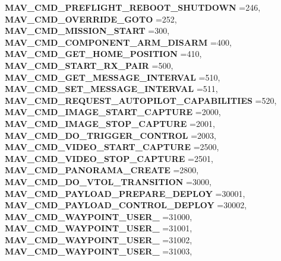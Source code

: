 \begin{DoxyCompactItemize}
\textbf{ M\+A\+V\+\_\+\+C\+M\+D\+\_\+\+P\+R\+E\+F\+L\+I\+G\+H\+T\+\_\+\+R\+E\+B\+O\+O\+T\+\_\+\+S\+H\+U\+T\+D\+O\+WN} =246, 
\newline
\textbf{ M\+A\+V\+\_\+\+C\+M\+D\+\_\+\+O\+V\+E\+R\+R\+I\+D\+E\+\_\+\+G\+O\+TO} =252, 
\textbf{ M\+A\+V\+\_\+\+C\+M\+D\+\_\+\+M\+I\+S\+S\+I\+O\+N\+\_\+\+S\+T\+A\+RT} =300, 
\textbf{ M\+A\+V\+\_\+\+C\+M\+D\+\_\+\+C\+O\+M\+P\+O\+N\+E\+N\+T\+\_\+\+A\+R\+M\+\_\+\+D\+I\+S\+A\+RM} =400, 
\textbf{ M\+A\+V\+\_\+\+C\+M\+D\+\_\+\+G\+E\+T\+\_\+\+H\+O\+M\+E\+\_\+\+P\+O\+S\+I\+T\+I\+ON} =410, 
\newline
\textbf{ M\+A\+V\+\_\+\+C\+M\+D\+\_\+\+S\+T\+A\+R\+T\+\_\+\+R\+X\+\_\+\+P\+A\+IR} =500, 
\textbf{ M\+A\+V\+\_\+\+C\+M\+D\+\_\+\+G\+E\+T\+\_\+\+M\+E\+S\+S\+A\+G\+E\+\_\+\+I\+N\+T\+E\+R\+V\+AL} =510, 
\textbf{ M\+A\+V\+\_\+\+C\+M\+D\+\_\+\+S\+E\+T\+\_\+\+M\+E\+S\+S\+A\+G\+E\+\_\+\+I\+N\+T\+E\+R\+V\+AL} =511, 
\textbf{ M\+A\+V\+\_\+\+C\+M\+D\+\_\+\+R\+E\+Q\+U\+E\+S\+T\+\_\+\+A\+U\+T\+O\+P\+I\+L\+O\+T\+\_\+\+C\+A\+P\+A\+B\+I\+L\+I\+T\+I\+ES} =520, 
\newline
\textbf{ M\+A\+V\+\_\+\+C\+M\+D\+\_\+\+I\+M\+A\+G\+E\+\_\+\+S\+T\+A\+R\+T\+\_\+\+C\+A\+P\+T\+U\+RE} =2000, 
\textbf{ M\+A\+V\+\_\+\+C\+M\+D\+\_\+\+I\+M\+A\+G\+E\+\_\+\+S\+T\+O\+P\+\_\+\+C\+A\+P\+T\+U\+RE} =2001, 
\textbf{ M\+A\+V\+\_\+\+C\+M\+D\+\_\+\+D\+O\+\_\+\+T\+R\+I\+G\+G\+E\+R\+\_\+\+C\+O\+N\+T\+R\+OL} =2003, 
\textbf{ M\+A\+V\+\_\+\+C\+M\+D\+\_\+\+V\+I\+D\+E\+O\+\_\+\+S\+T\+A\+R\+T\+\_\+\+C\+A\+P\+T\+U\+RE} =2500, 
\newline
\textbf{ M\+A\+V\+\_\+\+C\+M\+D\+\_\+\+V\+I\+D\+E\+O\+\_\+\+S\+T\+O\+P\+\_\+\+C\+A\+P\+T\+U\+RE} =2501, 
\textbf{ M\+A\+V\+\_\+\+C\+M\+D\+\_\+\+P\+A\+N\+O\+R\+A\+M\+A\+\_\+\+C\+R\+E\+A\+TE} =2800, 
\textbf{ M\+A\+V\+\_\+\+C\+M\+D\+\_\+\+D\+O\+\_\+\+V\+T\+O\+L\+\_\+\+T\+R\+A\+N\+S\+I\+T\+I\+ON} =3000, 
\textbf{ M\+A\+V\+\_\+\+C\+M\+D\+\_\+\+P\+A\+Y\+L\+O\+A\+D\+\_\+\+P\+R\+E\+P\+A\+R\+E\+\_\+\+D\+E\+P\+L\+OY} =30001, 
\newline
\textbf{ M\+A\+V\+\_\+\+C\+M\+D\+\_\+\+P\+A\+Y\+L\+O\+A\+D\+\_\+\+C\+O\+N\+T\+R\+O\+L\+\_\+\+D\+E\+P\+L\+OY} =30002, 
\textbf{ M\+A\+V\+\_\+\+C\+M\+D\+\_\+\+W\+A\+Y\+P\+O\+I\+N\+T\+\_\+\+U\+S\+E\+R\+\_} =31000, 
\textbf{ M\+A\+V\+\_\+\+C\+M\+D\+\_\+\+W\+A\+Y\+P\+O\+I\+N\+T\+\_\+\+U\+S\+E\+R\+\_} =31001, 
\textbf{ M\+A\+V\+\_\+\+C\+M\+D\+\_\+\+W\+A\+Y\+P\+O\+I\+N\+T\+\_\+\+U\+S\+E\+R\+\_} =31002, 
\newline
\textbf{ M\+A\+V\+\_\+\+C\+M\+D\+\_\+\+W\+A\+Y\+P\+O\+I\+N\+T\+\_\+\+U\+S\+E\+R\+\_} =31003, 

\end{DoxyCompactItemize}
